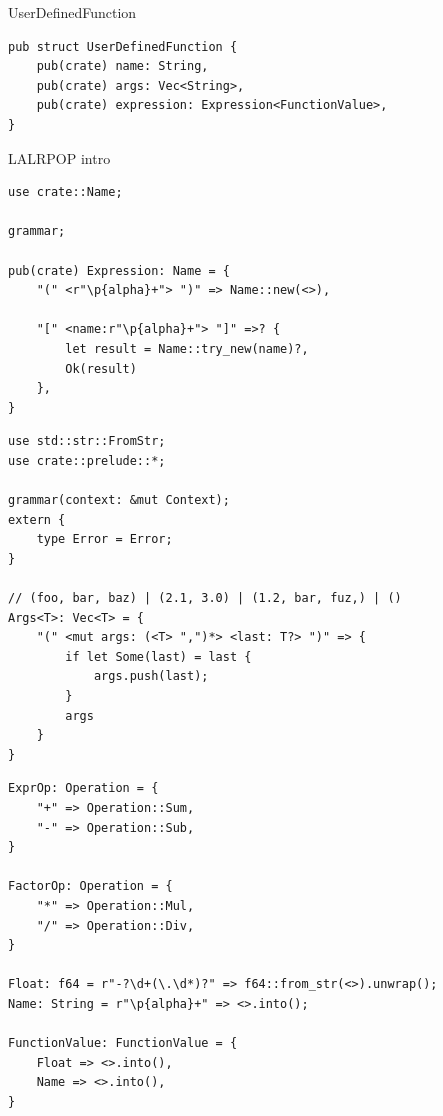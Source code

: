 \begin{frame}[fragile]{UserDefinedFunction}
    \begin{verbatim}
pub struct UserDefinedFunction {
    pub(crate) name: String,
    pub(crate) args: Vec<String>,
    pub(crate) expression: Expression<FunctionValue>,
}
    \end{verbatim}
\end{frame}

\begin{frame}[fragile]{LALRPOP intro}
    \begin{verbatim}
use crate::Name;

grammar;

pub(crate) Expression: Name = {
    "(" <r"\p{alpha}+"> ")" => Name::new(<>),

    "[" <name:r"\p{alpha}+"> "]" =>? {
        let result = Name::try_new(name)?,
        Ok(result)
    },
}
    \end{verbatim}
\end{frame}

\begin{frame}[fragile]
    \begin{verbatim}
use std::str::FromStr;
use crate::prelude::*;

grammar(context: &mut Context);
extern {
    type Error = Error;
}

// (foo, bar, baz) | (2.1, 3.0) | (1.2, bar, fuz,) | ()
Args<T>: Vec<T> = {
    "(" <mut args: (<T> ",")*> <last: T?> ")" => {
        if let Some(last) = last {
            args.push(last);
        }
        args
    }
}
    \end{verbatim}
\end{frame}

\begin{frame}[fragile]
    \begin{verbatim}
ExprOp: Operation = {
    "+" => Operation::Sum,
    "-" => Operation::Sub,
}

FactorOp: Operation = {
    "*" => Operation::Mul,
    "/" => Operation::Div,
}

Float: f64 = r"-?\d+(\.\d*)?" => f64::from_str(<>).unwrap();
Name: String = r"\p{alpha}+" => <>.into();

FunctionValue: FunctionValue = {
    Float => <>.into(),
    Name => <>.into(),
}
    \end{verbatim}
\end{frame}

